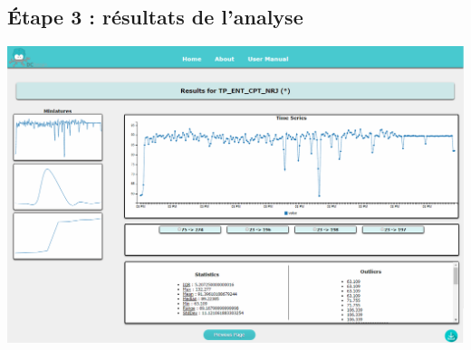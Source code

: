 		
	\subsection{Étape 3 : résultats de l'analyse}
		
		\begin{center}\includegraphics[scale=0.45]{fenetre3.png}\end{center}
			
